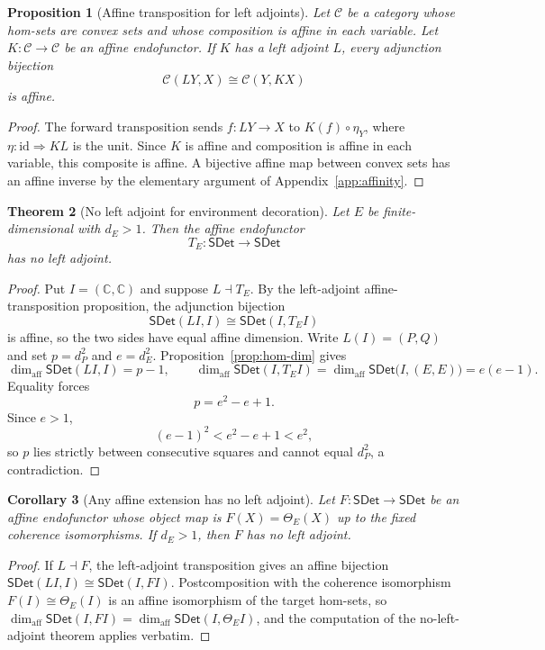 \documentclass[11pt,a4paper]{article}
\theoremstyle{definition}
\theoremstyle{plain}
\newtheorem{theorem}{Theorem}[section]
\newtheorem{proposition}[theorem]{Proposition}
\newtheorem{corollary}[theorem]{Corollary}
\theoremstyle{remark}
\newcommand{\affdim}{\dim_{\mathrm{aff}}}
\newcommand{\id}{\mathrm{id}}
\newcommand{\SDet}{\mathsf{SDet}}
\begin{document}
\begin{proposition}[Affine transposition for left adjoints]
Let $\mathcal C$ be a category whose hom-sets are convex sets and whose
composition is affine in each variable. Let $K:\mathcal C\to\mathcal C$
be an affine endofunctor. If $K$ has a left adjoint $L$, every adjunction
bijection
\[
\mathcal C(LY,X)\cong\mathcal C(Y,KX)
\]
is affine.
\end{proposition}
\begin{proof}
The forward transposition sends $f:LY\to X$ to
$K(f)\circ\eta_Y$, where $\eta:\id\Rightarrow KL$ is the unit. Since
$K$ is affine and composition is affine in each variable, this composite
is affine. A bijective affine map between convex sets has an affine
inverse by the elementary argument of Appendix~\ref{app:affinity}.
\end{proof}

\begin{theorem}[No left adjoint for environment decoration]
Let $E$ be finite-dimensional with $d_E>1$. Then the affine endofunctor
\[
T_E:\SDet\to\SDet
\]
has no left adjoint.
\end{theorem}
\begin{proof}
Put $I=(\mathbb C,\mathbb C)$ and suppose $L\dashv T_E$. By the
left-adjoint affine-transposition proposition, the adjunction bijection
\[
\SDet(LI,I)\cong\SDet(I,T_EI)
\]
is affine, so the two sides have equal affine dimension. Write
$L(I)=(P,Q)$ and set $p=d_P^2$ and $e=d_E^2$.
Proposition~\ref{prop:hom-dim} gives
\[
\affdim\SDet(LI,I)=p-1,
\qquad
\affdim\SDet(I,T_EI)=\affdim\SDet\bigl(I,(E,E)\bigr)=e(e-1).
\]
Equality forces
\[
p=e^2-e+1.
\]
Since $e>1$,
\[
(e-1)^2<e^2-e+1<e^2,
\]
so $p$ lies strictly between consecutive squares and cannot equal
$d_P^2$, a contradiction.
\end{proof}

\begin{corollary}[Any affine extension has no left adjoint]
Let $F:\SDet\to\SDet$ be an affine endofunctor whose object map is
$F(X)=\Theta_E(X)$ up to the fixed coherence isomorphisms. If $d_E>1$,
then $F$ has no left adjoint.
\end{corollary}
\begin{proof}
If $L\dashv F$, the left-adjoint transposition gives an affine bijection
$\SDet(LI,I)\cong\SDet(I,FI)$. Postcomposition with the coherence
isomorphism $F(I)\cong\Theta_E(I)$ is an affine isomorphism of the
target hom-sets, so $\affdim\SDet(I,FI)=\affdim\SDet(I,\Theta_E I)$,
and the computation of the no-left-adjoint theorem applies verbatim.
\end{proof}
\end{document}
